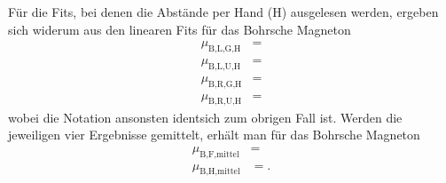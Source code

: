 Für die Fits, bei denen die Abstände per Hand (H) ausgelesen werden, ergeben sich widerum aus den linearen Fits für das Bohrsche Magneton
\begin{align*}
  \mu_{\text{B,L,G,H}} &= \\
  \mu_{\text{B,L,U,H}} &= \\
  \mu_{\text{B,R,G,H}} &= \\
  \mu_{\text{B,R,U,H}} &= 
\end{align*}
wobei die Notation ansonsten identsich zum obrigen Fall ist.
Werden die jeweiligen vier Ergebnisse gemittelt, erhält man für das Bohrsche Magneton
\begin{align*}
  \mu_{\text{B,F,mittel}} &= \\
  \mu_{\text{B,H,mittel}} &= .
\end{align*}
